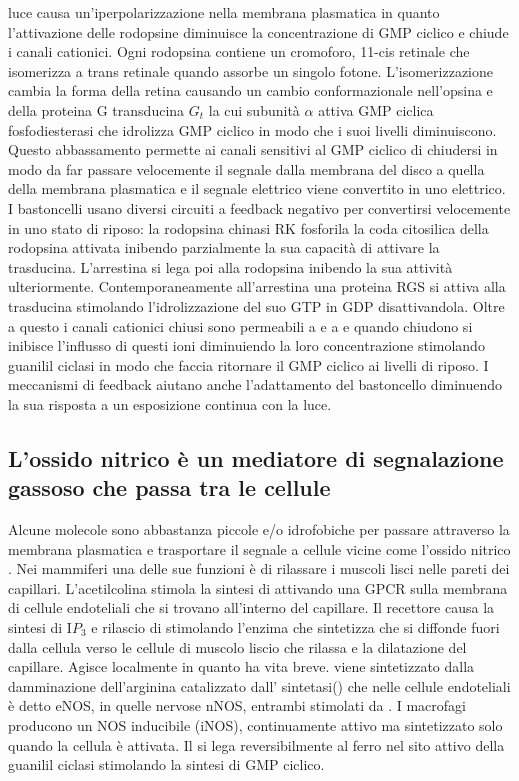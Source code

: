luce causa un'iperpolarizzazione nella membrana plasmatica in quanto l'attivazione delle rodopsine diminuisce la concentrazione di GMP ciclico e chiude i canali cationici. Ogni 
rodopsina contiene un cromoforo, 11-cis retinale che isomerizza a trans retinale quando assorbe un singolo fotone. L'isomerizzazione cambia la forma della retina causando un cambio 
conformazionale nell'opsina e della proteina G transducina $G_t$ la cui subunit\`a $\alpha$ attiva GMP ciclica fosfodiesterasi che idrolizza GMP ciclico in modo che i suoi livelli
diminuiscono. Questo abbassamento permette ai canali sensitivi al GMP ciclico di chiudersi in modo da far passare velocemente il segnale dalla membrana del disco a quella della
membrana plasmatica e il segnale elettrico viene convertito in uno elettrico. I bastoncelli usano diversi circuiti a feedback negativo per convertirsi velocemente in uno 
stato di riposo: la rodopsina chinasi RK fosforila la coda citosilica della rodopsina attivata inibendo parzialmente la sua capacit\`a di attivare la trasducina. L'arrestina si lega poi
alla rodopsina inibendo la sua attivit\`a ulteriormente. Contemporaneamente all'arrestina una proteina RGS si attiva alla trasducina stimolando l'idrolizzazione del suo GTP in GDP
disattivandola. Oltre a questo i canali cationici chiusi sono permeabili a  e a  e quando chiudono si inibisce l'influsso di questi ioni diminuiendo la 
loro concentrazione stimolando guanilil ciclasi in modo che faccia ritornare il GMP ciclico ai livelli di riposo. I meccanismi di feedback aiutano anche l'adattamento del bastoncello
diminuendo la sua risposta a un esposizione continua con la luce. 
\subsection{L'ossido nitrico \`e un mediatore di segnalazione gassoso che passa tra le cellule}
Alcune molecole sono abbastanza piccole e/o idrofobiche per passare attraverso la membrana plasmatica e trasportare il segnale a cellule vicine come l'ossido nitrico . Nei 
mammiferi una delle sue funzioni \`e di rilassare i muscoli lisci nelle pareti dei capillari. L'acetilcolina stimola la sintesi di  attivando una GPCR sulla membrana di cellule
endoteliali che si trovano all'interno del capillare. Il recettore causa la sintesi di I$P_3$ e rilascio di  stimolando l'enzima che sintetizza  che si diffonde 
fuori dalla cellula verso le cellule di muscolo liscio che rilassa e la dilatazione del capillare. Agisce localmente in quanto ha vita breve.  viene sintetizzato dalla 
damminazione dell'arginina catalizzato dall' sintetasi() che nelle cellule endoteliali \`e detto eNOS, in quelle nervose nNOS, entrambi stimolati da . I
macrofagi producono un NOS inducibile (iNOS), continuamente attivo ma sintetizzato solo quando la cellula \`e attivata. Il  si lega reversibilmente al ferro nel sito attivo
della guanilil ciclasi stimolando la sintesi di GMP ciclico. 
